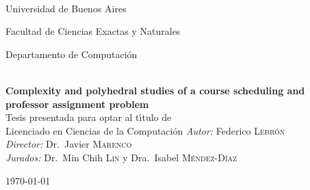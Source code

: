 \begin{titlepage}

\begin{center}


\begin{flushleft}
%
\hfill
{}\\[2.0cm]
\end{flushleft}

{\large \sc Universidad de Buenos Aires

Facultad de Ciencias Exactas y Naturales

Departamento de Computaci\'on} \\[2cm]

{ \LARGE \bfseries Complexity and polyhedral studies of a course scheduling and professor assignment problem}\\[2.6cm]
{\large Tesis presentada para optar al t\'{\i}tulo de\\
Licenciado en Ciencias de la Computaci\'on}
\vfill
{\large \emph{Autor:} Federico \textsc{Lebrón}\\[0.5cm]
\emph{Director:} 
Dr.~Javier \textsc{Marenco} \\[0.5cm]
\emph{Jurados:} 
Dr.~Min Chih \textsc{Lin} y 
Dra.~Isabel \textsc{Méndez-Díaz}
}
\vfill

{\large \today}

\end{center}
\end{titlepage}
